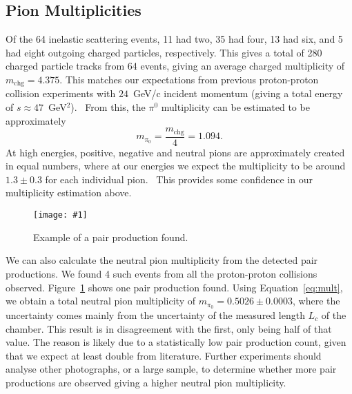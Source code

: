 \documentclass[twocolumn]{article}
\newcommand{\insertFigure}[1]{%
   \texttt{[image: \#1]}%
}
\begin{document}
\subsection{Pion Multiplicities}
Of the 64 inelastic scattering events, 11 had two, 35 had four, 13 had six, and 5 had eight outgoing charged particles, respectively. This gives a total of 280 charged particle tracks from 64 events, giving an average charged multiplicity of $m_{\text{chg}} = 4.375$.
This matches our expectations from previous proton-proton collision experiments with $24$~GeV/c incident momentum (giving a total energy of $s \approx 47$~GeV$^2$).~\cite{Fernow} From this, the $\pi^0$ multiplicity can be estimated to be approximately 
\begin{equation}
	m_{\pi_0} = \frac{m_{\text{chg}}}{4} = 1.094. \nonumber
\end{equation}
At high energies, positive, negative and neutral pions are approximately created in equal numbers, where at our energies we expect the multiplicity to be around $1.3 \pm 0.3$ for each individual pion.~\cite{perkins, Fernow} This provides some confidence in our multiplicity estimation above.
\begin{figure}[!h]
	\centering
	\insertFigure{pair.png}
	\caption{Example of a pair production found.}
	\label{fig:pair}
\end{figure}
\par We can also calculate the neutral pion multiplicity from the detected pair productions. We found 4 such events from all the proton-proton collisions observed. Figure~\ref{fig:pair} shows one pair production found. Using Equation~\ref{eq:mult}, we obtain a total neutral pion multiplicity of $m_{\pi_0} =  0.5026 \pm 0.0003$, where the uncertainty comes mainly from the uncertainty of the measured length $L_c$ of the chamber. This result is in disagreement with the first, only being half of that value. The reason is likely due to a statistically low pair production count, given that we expect at least double from literature. Further experiments should analyse other photographs, or a large sample, to determine whether more pair productions are observed giving a higher neutral pion multiplicity.
\end{document}
